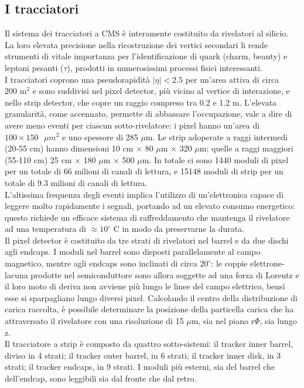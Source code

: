 \subsection{I tracciatori}
Il sistema dei tracciatori a CMS \`e interamente costituito da rivelatori al silicio. La loro elevata precisione nella ricostruzione dei vertici secondari li rende strumenti di vitale importanza per l'identificazione di quark (charm, beauty) e leptoni pesanti ($\tau$), prodotti in numerosissimi processi fisici interessanti.\\
I tracciatori coprono una pseudorapidit\`a $|\eta|<2.5$ per un'area attiva di circa $200\mbox{ m}^2$ e sono suddivisi nel pixel detector, pi\`u vicino al vertice di interazione, e nello strip detector, che copre un raggio compreso tra 0.2 e 1.2 m. L'elevata granularit\`a, come accennato, permette di abbassare l'occupazione, vale a dire di avere meno eventi per ciascun sotto-rivelatore: i pixel hanno un'area di $100 \times 150 \mbox{ }{\mu{m}}^2$ e uno spessore di 285 $\mu$m. Le strip adoperate a raggi intermedi (20-55 cm) hanno dimensioni 10 cm $\times$ 80 $\mu$m $\times$ 320 $\mu$m; quelle a raggi maggiori (55-110 cm) 25 cm $\times$ 180 $\mu$m $\times$ 500 $\mu$m. In totale ci sono 1440 moduli di pixel per un totale di 66 milioni di canali di lettura, e 15148 moduli di strip per un totale di 9.3 milioni di canali di lettura.\\
L'altissima frequenza degli eventi implica l'utilizzo di un'elettronica capace di leggere molto rapidamente i segnali, portando ad un elevato consumo energetico: questo richiede un efficace sistema di raffreddamento che mantenga il rivelatore ad una temperatura di $\approx10^{\circ}$ C in modo da preservarne la durata.\\
Il pixel detector \`e costituito da tre strati di rivelatori nel barrel e da due dischi agli endcaps. I moduli nel barrel sono disposti parallelamente al campo magnetico, mentre agli endcaps sono inclinati di circa $20^{\circ}$: le coppie elettrone-lacuna prodotte nel semiconduttore sono allora soggette ad una forza di Lorentz e il loro moto di deriva non avviene pi\`u lungo le linee del campo elettrico, bens\`i esse si sparpagliano lungo diversi pixel. Calcolando il centro della distribuzione di carica raccolta, \`e possibile determinare la posizione della particella carica che ha attraversato il rivelatore con una risoluzione di 15 $\mu$m, sia nel piano $\mathrm{r}\Phi$, sia lungo $\mathrm{z}$.\\
Il tracciatore a strip \`e composto da quattro sotto-sistemi: il tracker inner barrel, diviso in 4 strati; il tracker outer barrel, in 6 strati; il tracker inner disk, in 3 strati; il tracker endcaps, in 9 strati. I moduli pi\`u esterni, sia del barrel che dell'endcap, sono leggibili sia dal fronte che dal retro.\\
